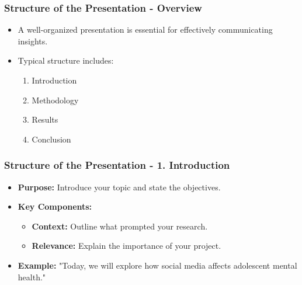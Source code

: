 \documentclass[aspectratio=169]{beamer}
\begin{document}
\begin{frame}[fragile]
    \frametitle{Structure of the Presentation - Overview}
    \begin{itemize}
        \item A well-organized presentation is essential for effectively communicating insights.
        \item Typical structure includes:
        \begin{enumerate}
            \item Introduction
            \item Methodology
            \item Results
            \item Conclusion
        \end{enumerate}
    \end{itemize}
\end{frame}

\begin{frame}[fragile]
    \frametitle{Structure of the Presentation - 1. Introduction}
    \begin{itemize}
        \item \textbf{Purpose:} Introduce your topic and state the objectives.
        \item \textbf{Key Components:}
        \begin{itemize}
            \item \textbf{Context:} Outline what prompted your research.
            \item \textbf{Relevance:} Explain the importance of your project.
        \end{itemize}
        \item \textbf{Example:} "Today, we will explore how social media affects adolescent mental health."
    \end{itemize}
\end{frame}
\end{document}
